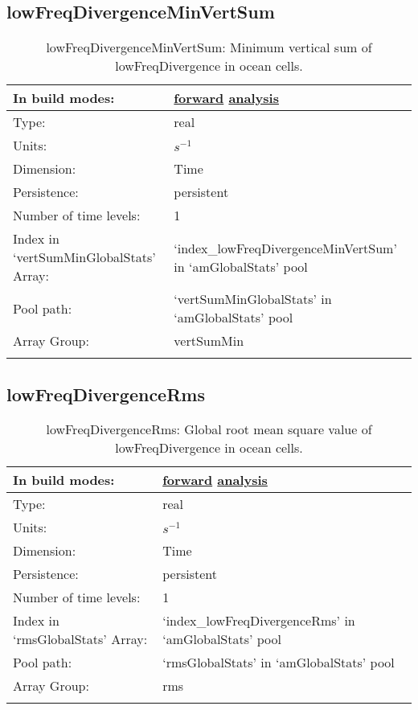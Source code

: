 \subsection[lowFreqDivergenceMinVertSum]{lowFreqDivergenceMinVertSum}
\label{subsec:var_sec_amGlobalStats_lowFreqDivergenceMinVertSum}
\begin{center}
\begin{longtable}{| p{2.0in} | p{4.0in} |}
        \hline 
        In build modes: & \hyperref[subsec:forward_var_tab_amGlobalStats]{forward} \hyperref[subsec:analysis_var_tab_amGlobalStats]{analysis} \\
        \hline 
        Type: & real \\
        \hline 
        Units: & $s^{-1}$ \\
        \hline 
        Dimension: & Time \\
        \hline 
        Persistence: & persistent \\
        \hline 
        Number of time levels: & 1 \\
        \hline 
		 Index in `vertSumMinGlobalStats' Array: & `index\_lowFreqDivergenceMinVertSum' in `amGlobalStats' pool \\
		 \hline 
            Pool path: & `vertSumMinGlobalStats' in `amGlobalStats' pool \\
		 \hline 
		 Array Group: & vertSumMin \\
		 \hline 
    \caption{lowFreqDivergenceMinVertSum: Minimum vertical sum of lowFreqDivergence in ocean cells.}
\end{longtable}
\end{center}
\subsection[lowFreqDivergenceRms]{lowFreqDivergenceRms}
\label{subsec:var_sec_amGlobalStats_lowFreqDivergenceRms}
\begin{center}
\begin{longtable}{| p{2.0in} | p{4.0in} |}
        \hline 
        In build modes: & \hyperref[subsec:forward_var_tab_amGlobalStats]{forward} \hyperref[subsec:analysis_var_tab_amGlobalStats]{analysis} \\
        \hline 
        Type: & real \\
        \hline 
        Units: & $s^{-1}$ \\
        \hline 
        Dimension: & Time \\
        \hline 
        Persistence: & persistent \\
        \hline 
        Number of time levels: & 1 \\
        \hline 
		 Index in `rmsGlobalStats' Array: & `index\_lowFreqDivergenceRms' in `amGlobalStats' pool \\
		 \hline 
            Pool path: & `rmsGlobalStats' in `amGlobalStats' pool \\
		 \hline 
		 Array Group: & rms \\
		 \hline 
    \caption{lowFreqDivergenceRms: Global root mean square value of lowFreqDivergence in ocean cells.}
\end{longtable}
\end{center}
